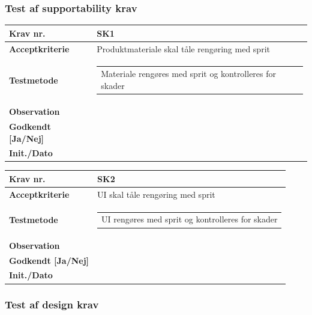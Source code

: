 \vspace{5mm}

\subsubsection{Test af supportability krav}

\begin{tabularx}{1\textwidth}{|l|X|}
\hline
\textbf{Krav nr.}              & SK1  \\ \hline
\textbf{Acceptkriterie}        & Produktmateriale skal tåle rengøring med sprit \\ \hline
\textbf{Testmetode}            & \begin{tabular}[l]{@{}l@{}} Materiale rengøres med sprit og kontrolleres for skader \end{tabular}  \\ \hline
\textbf{Observation}           &  \\ \hline
\textbf{Godkendt {[}Ja/Nej{]}} &  \\ \hline
\textbf{Init./Dato}            &  \\ \hline
\end{tabularx}

\begin{tabularx}{1\textwidth}{|l|X|}
\hline
\textbf{Krav nr.}              & SK2  \\ \hline
\textbf{Acceptkriterie}        & UI skal tåle rengøring med sprit \\ \hline
\textbf{Testmetode}            & \begin{tabular}[l]{@{}l@{}} UI rengøres med sprit og kontrolleres for skader \end{tabular}  \\ \hline
\textbf{Observation}           &  \\ \hline
\textbf{Godkendt {[}Ja/Nej{]}} &  \\ \hline
\textbf{Init./Dato}            &  \\ \hline
\end{tabularx}

\vspace{5mm}

\subsubsection{Test af design krav}

